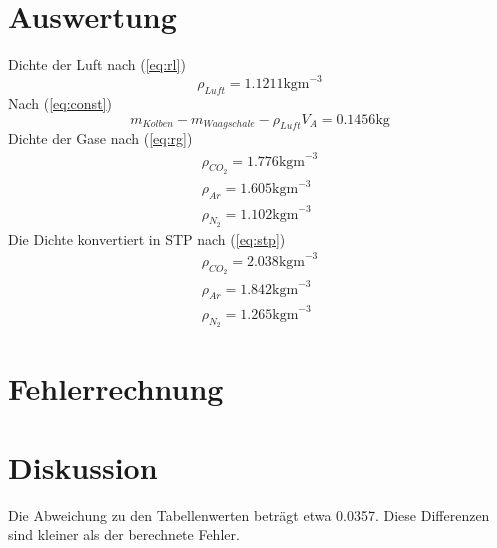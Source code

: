 \documentclass[12pt,a4paper]{article}
\begin{document}
\section*{Auswertung}
Dichte der Luft nach (\ref{eq:rl})
\[ \rho_{Luft} = 1.1211 \mbox{kgm}^{-3} \]
Nach (\ref{eq:const})
\[ m_{Kolben} - m_{Waagschale} - \rho_{Luft} V_A = 0.1456 \mbox{kg} \]
Dichte der Gase nach (\ref{eq:rg})
\begin{eqnarray*}
\rho_{CO_2} = 1.776 \mbox{kgm}^{-3} \\
\rho_{Ar} = 1.605 \mbox{kgm}^{-3} \\
\rho_{N_2} = 1.102 \mbox{kgm}^{-3}
\end{eqnarray*}
Die Dichte konvertiert in STP nach (\ref{eq:stp})
\begin{eqnarray*}
\rho_{CO_2} = 2.038 \mbox{kgm}^{-3} \\
\rho_{Ar} = 1.842 \mbox{kgm}^{-3} \\
\rho_{N_2} = 1.265 \mbox{kgm}^{-3}
\end{eqnarray*}
\section*{Fehlerrechnung}


\section*{Diskussion}
Die Abweichung zu den Tabellenwerten betr\"agt etwa 0.0357. Diese Differenzen sind kleiner als der berechnete Fehler.
\end{document}
